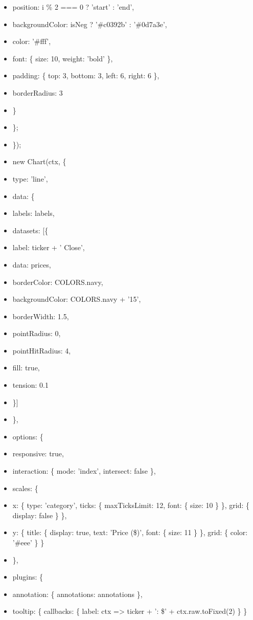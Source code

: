 \documentclass[11pt]{article}
\begin{document}
\begin{itemize}[leftmargin=*,itemsep=2pt,topsep=2pt]
\item {} position: i \% 2 === 0 ? 'start' : 'end',
\item {} backgroundColor: isNeg ? '\#c0392b' : '\#0d7a3e',
\item {} color: '\#fff',
\item {} font: \{ size: 10, weight: 'bold' \},
\item {} padding: \{ top: 3, bottom: 3, left: 6, right: 6 \},
\item {} borderRadius: 3
\item {} \}
\item {} \};
\item {} \});
\item {} new Chart(ctx, \{
\item {} type: 'line',
\item {} data: \{
\item {} labels: labels,
\item {} datasets: [\{
\item {} label: ticker + ' Close',
\item {} data: prices,
\item {} borderColor: COLORS.navy,
\item {} backgroundColor: COLORS.navy + '15',
\item {} borderWidth: 1.5,
\item {} pointRadius: 0,
\item {} pointHitRadius: 4,
\item {} fill: true,
\item {} tension: 0.1
\item {} \}]
\item {} \},
\item {} options: \{
\item {} responsive: true,
\item {} interaction: \{ mode: 'index', intersect: false \},
\item {} scales: \{
\item {} x: \{ type: 'category', ticks: \{ maxTicksLimit: 12, font: \{ size: 10 \} \}, grid: \{ display: false \} \},
\item {} y: \{ title: \{ display: true, text: 'Price (\$)', font: \{ size: 11 \} \}, grid: \{ color: '\#eee' \} \}
\item {} \},
\item {} plugins: \{
\item {} annotation: \{ annotations: annotations \},
\item {} tooltip: \{ callbacks: \{ label: ctx => ticker + ': \$' + ctx.raw.toFixed(2) \} \}

\end{itemize}
\end{document}
